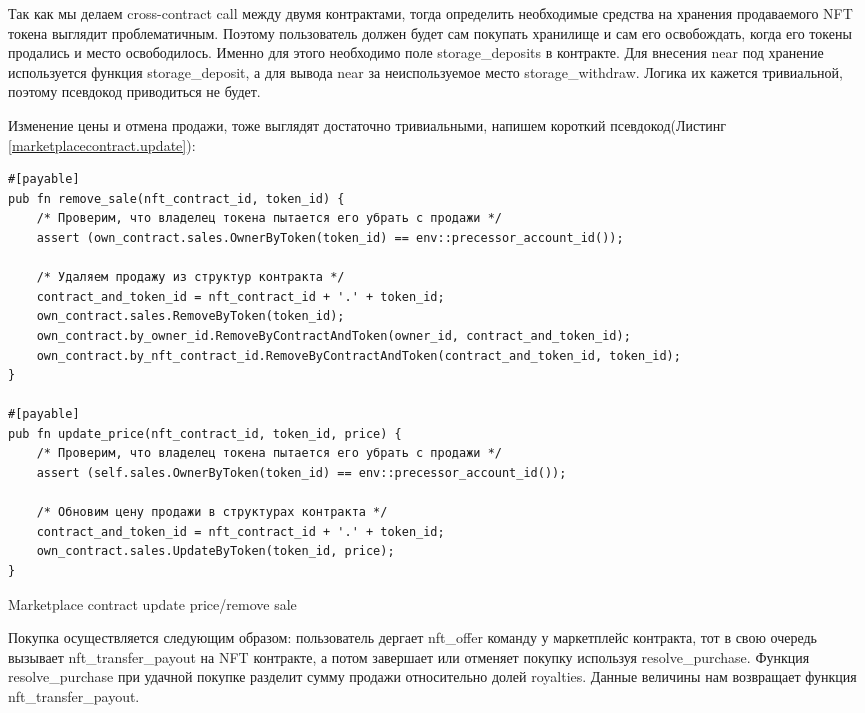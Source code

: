 Так как мы делаем cross-contract call между двумя контрактами, тогда определить необходимые средства на хранения продаваемого NFT токена выглядит проблематичным.
Поэтому пользователь должен будет сам покупать хранилище и сам его освобождать, когда его токены продались и место освободилось. Именно для этого необходимо поле storage\_deposits в контракте.
Для внесения near под хранение используется функция storage\_deposit, а для вывода near за неиспользуемое место storage\_withdraw. Логика их кажется тривиальной, поэтому псевдокод приводиться не будет.

Изменение цены и отмена продажи, тоже выглядят достаточно тривиальными, напишем короткий псевдокод(Листинг {\color{blue}\ref{marketplacecontract.update}}):

\begin{listing}
\begin{verbatim}
#[payable]
pub fn remove_sale(nft_contract_id, token_id) {
    /* Проверим, что владелец токена пытается его убрать с продажи */
    assert (own_contract.sales.OwnerByToken(token_id) == env::precessor_account_id());

    /* Удаляем продажу из структур контракта */
    contract_and_token_id = nft_contract_id + '.' + token_id;
    own_contract.sales.RemoveByToken(token_id);
    own_contract.by_owner_id.RemoveByContractAndToken(owner_id, contract_and_token_id);
    own_contract.by_nft_contract_id.RemoveByContractAndToken(contract_and_token_id, token_id);
}

#[payable]
pub fn update_price(nft_contract_id, token_id, price) {
    /* Проверим, что владелец токена пытается его убрать с продажи */
    assert (self.sales.OwnerByToken(token_id) == env::precessor_account_id());

    /* Обновим цену продажи в структурах контракта */
    contract_and_token_id = nft_contract_id + '.' + token_id;
    own_contract.sales.UpdateByToken(token_id, price);
}
\end{verbatim}
\caption{Marketplace contract update price/remove sale}
\label{marketplacecontract.update}
\end{listing}

Покупка осуществляется следующим образом: пользователь дергает nft\_offer команду у маркетплейс контракта, тот в свою очередь вызывает nft\_transfer\_payout на NFT контракте, а потом завершает или отменяет покупку используя resolve\_purchase.
Функция resolve\_purchase при удачной покупке разделит сумму продажи относительно долей royalties. Данные величины нам возвращает функция nft\_transfer\_payout.

